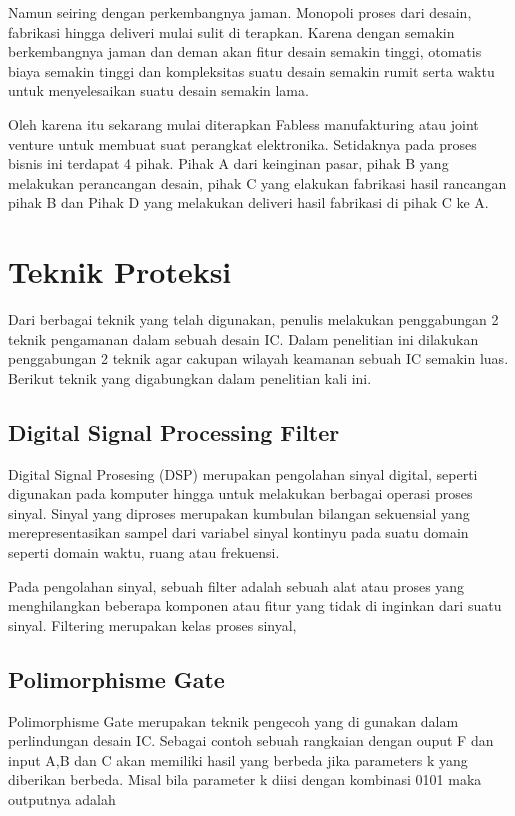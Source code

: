 Namun seiring dengan perkembangnya jaman. Monopoli proses dari desain, fabrikasi hingga deliveri mulai sulit di terapkan. Karena dengan semakin berkembangnya jaman dan deman akan fitur desain semakin tinggi, otomatis biaya semakin tinggi dan kompleksitas suatu desain semakin rumit serta waktu untuk menyelesaikan suatu desain semakin lama.

Oleh karena itu sekarang mulai diterapkan Fabless manufakturing atau joint venture untuk membuat suat perangkat elektronika. Setidaknya pada proses bisnis ini terdapat 4 pihak. Pihak A dari keinginan pasar, pihak B yang melakukan perancangan desain, pihak C yang elakukan fabrikasi hasil rancangan pihak B dan Pihak D yang melakukan deliveri hasil fabrikasi di pihak C ke A.

% 

\section{Teknik Proteksi}
Dari berbagai teknik yang telah digunakan, penulis melakukan penggabungan 2 teknik pengamanan dalam sebuah desain IC. Dalam penelitian ini dilakukan penggabungan 2 teknik agar cakupan wilayah keamanan sebuah IC semakin luas. Berikut teknik yang digabungkan dalam penelitian kali ini.

\subsection{Digital Signal Processing Filter}
Digital Signal Prosesing (DSP) merupakan pengolahan sinyal digital, seperti digunakan pada komputer hingga untuk melakukan berbagai operasi proses sinyal. Sinyal yang diproses merupakan kumbulan bilangan sekuensial yang merepresentasikan sampel dari variabel sinyal kontinyu pada suatu domain seperti domain waktu, ruang atau frekuensi.

Pada pengolahan sinyal, sebuah filter adalah sebuah alat atau proses yang menghilangkan beberapa komponen atau fitur yang tidak di inginkan dari suatu sinyal. Filtering merupakan kelas proses sinyal, 

\subsection{Polimorphisme Gate}
Polimorphisme Gate merupakan teknik pengecoh yang di gunakan dalam perlindungan desain IC. Sebagai contoh sebuah rangkaian dengan ouput F dan input A,B dan C akan memiliki hasil yang berbeda jika parameters k yang diberikan berbeda. Misal bila parameter k diisi dengan kombinasi 0101 maka outputnya adalah

